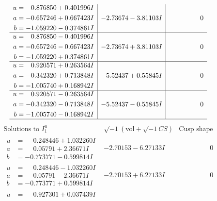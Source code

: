 \documentclass[1p]{elsarticle_modified}
\theoremstyle{definition}
\newcommand{\I}{\sqrt{-1}}
\begin{document}
$$\begin{array}{c|c|c}
\begin{aligned}
u &= \phantom{-}0.876850 + 0.401996 I \\
a &= -0.657246 + 0.667423 I \\
b &= -1.059220 - 0.374861 I\end{aligned}
 & -2.73674 - 3.81103 I & \phantom{-0.000000 } 0 \\ \hline\begin{aligned}
u &= \phantom{-}0.876850 - 0.401996 I \\
a &= -0.657246 - 0.667423 I \\
b &= -1.059220 + 0.374861 I\end{aligned}
 & -2.73674 + 3.81103 I & \phantom{-0.000000 } 0 \\ \hline\begin{aligned}
u &= \phantom{-}0.920571 + 0.263564 I \\
a &= -0.342320 + 0.713848 I \\
b &= -1.005740 + 0.168942 I\end{aligned}
 & -5.52437 + 0.55845 I & \phantom{-0.000000 } 0 \\ \hline\begin{aligned}
u &= \phantom{-}0.920571 - 0.263564 I \\
a &= -0.342320 - 0.713848 I \\
b &= -1.005740 - 0.168942 I\end{aligned}
 & -5.52437 - 0.55845 I & \phantom{-0.000000 } 0\\
 \hline 
 \end{array}$$\newpage$$\begin{array}{c|c|c}  
\text{Solutions to }I^u_{1}& \I (\text{vol} + \sqrt{-1}CS) & \text{Cusp shape}\\
 \hline 
\begin{aligned}
u &= \phantom{-}0.248446 + 1.032260 I \\
a &= \phantom{-}0.05791 + 2.36671 I \\
b &= -0.773771 - 0.599814 I\end{aligned}
 & -2.70153 - 6.27133 I & \phantom{-0.000000 } 0 \\ \hline\begin{aligned}
u &= \phantom{-}0.248446 - 1.032260 I \\
a &= \phantom{-}0.05791 - 2.36671 I \\
b &= -0.773771 + 0.599814 I\end{aligned}
 & -2.70153 + 6.27133 I & \phantom{-0.000000 } 0 \\ \hline\begin{aligned}
u &= \phantom{-}0.927301 + 0.037439 I \\

\end{aligned}
\end{array}$$
\end{document}
